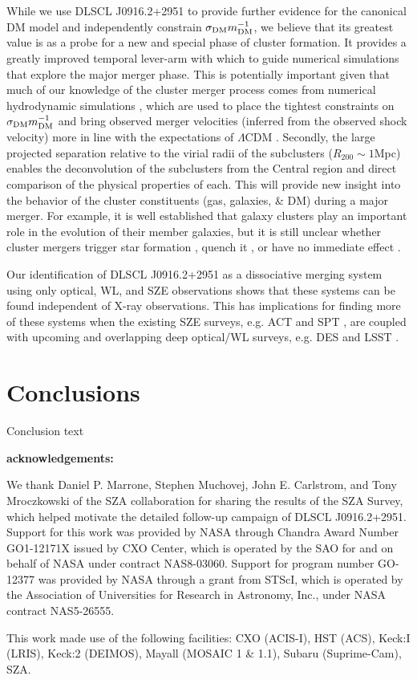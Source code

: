 While we use DLSCL J0916.2+2951 to provide further evidence for the canonical DM model and independently constrain $\sigma_{\rm DM}m^{-1}_{\rm DM}$, we believe that its greatest value is as a probe for a new and special phase of cluster formation.  
It provides a greatly improved temporal lever-arm with which to guide numerical simulations that explore the major merger phase.  
This is potentially important given that much of our knowledge of the cluster merger process comes from numerical hydrodynamic simulations \cite[e.g.][]{Poole:2006gp}, which are used to place the tightest constraints on $\sigma_{\rm DM}m^{-1}_{\rm DM}$ \citep[$<0.7$\,cm$^2$\,g$^{-1}$;][]{Randall:2008hs} and bring observed merger velocities (inferred from the observed shock velocity) more in line with the expectations of $\Lambda$CDM \citep{Springel:2007bg,Lee:2010id}.
Secondly, the large projected separation relative to the virial radii of the subclusters ($R_{200} \sim 1$Mpc) enables the deconvolution of the subclusters from the Central region and direct comparison of the physical properties of each.
This will provide new insight into the behavior of the cluster constituents (gas, galaxies, \& DM) during a major merger.
For example, it is well established that galaxy clusters play an important role in the evolution of their member galaxies, but it is still unclear whether cluster mergers trigger star formation \citep[e.g.][]{Miller:2003kx,Owen:2005dx,Ferrari:2005es,Hwang:2009ip}, quench it \citep{Poggianti:2004ca}, or have no immediate effect \citep{Chung:2010ds}.

Our identification of DLSCL J0916.2+2951 as a dissociative merging system using only optical, WL, and SZE observations shows that these systems can be found independent of X-ray observations.
This has implications for finding more of these systems when the existing SZE surveys, e.g. ACT \citep{Hincks:2010ff} and SPT \citep{Ruhl:2004io}, are coupled with upcoming and overlapping deep optical/WL surveys, e.g. DES \citep{Collaboration:2005vv} and LSST \citep{Tyson:2002hn}.

\section{Conclusions}

Conclusion text

\textbf{acknowledgements:}

We thank Daniel P. Marrone, Stephen Muchovej,  John E. Carlstrom, and Tony Mroczkowski of the SZA collaboration for sharing the results of the SZA Survey, which helped motivate the detailed follow-up campaign of DLSCL J0916.2+2951. 
Support for this work was provided by NASA through Chandra Award Number GO1-12171X issued by CXO Center, which is operated by the SAO for and on behalf of NASA under contract NAS8-03060.  Support for program number GO-12377 was provided by NASA through a grant from STScI, which is operated by the Association of Universities for Research in Astronomy, Inc., under NASA contract NAS5-26555.

This work made use of the following facilities: CXO (ACIS-I), HST (ACS), Keck:I (LRIS), Keck:2 (DEIMOS), Mayall (MOSAIC 1 \& 1.1), Subaru (Suprime-Cam), SZA.
